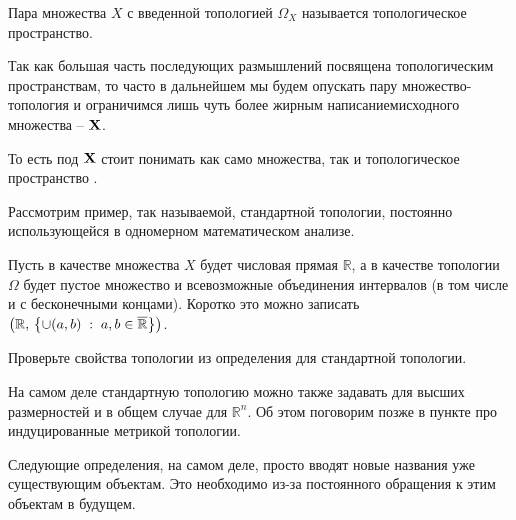 \begin{Def}
    Пара \topX множества $X$ с введенной топологией $\Omega_X$ называется топологическое пространство.
\end{Def}
\begin{Note}
    Так как большая часть последующих размышлений посвящена топологическим пространствам, то часто в дальнейшем мы будем опускать пару множество-топология и ограничимся лишь чуть более жирным написаниемисходного множества -- $\mathbf{X}$.

    То есть под $\mathbf{X}$ стоит понимать как само множества, так и топологическое пространство \topX.
\end{Note}

\begin{Ex}
    Рассмотрим пример, так называемой, стандартной топологии, постоянно использующейся в одномерном  математическом анализе.

    Пусть в качестве множества  $X$ будет числовая прямая $\mathbb{R}$, а в качестве топологии $\Omega$ будет пустое множество и всевозможные объединения интервалов (в том числе и с бесконечными концами). Коротко это можно записать $\left( \mathbb{R}, \, \left\{ \cup(a,b) \; : \; a,b \in \overline{\mathbb{R}} \right\} \right)$.
\end{Ex}
\begin{Task}
    Проверьте свойства топологии из определения для стандартной топологии.
\end{Task}

На самом деле стандартную топологию можно также задавать для высших размерностей и в общем случае для $\mathbb{R}^n$. Об этом поговорим позже в пункте про индуцированные метрикой топологии.

Следующие определения, на самом деле, просто вводят новые названия уже существующим объектам. Это необходимо из-за постоянного обращения к этим объектам в будущем.

